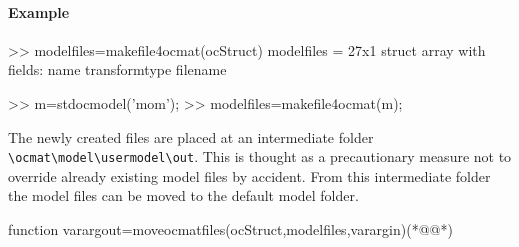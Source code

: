 \paragraph{Example}
\begin{matlab}
>> modelfiles=makefile4ocmat(ocStruct)
modelfiles = 
27x1 struct array with fields:
    name
    transformtype
    filename

>> m=stdocmodel('mom');
>> modelfiles=makefile4ocmat(m);
\end{matlab}
The newly created files are placed at an intermediate folder \lstinline+\ocmat\model\usermodel\out+. This is thought as a precautionary measure not to override already existing model files by accident. From this intermediate folder the model files can be moved to the default model folder.
\begin{matlab}
function varargout=moveocmatfiles(ocStruct,modelfiles,varargin)(*@@*)
%
%
%
\end{matlab}
